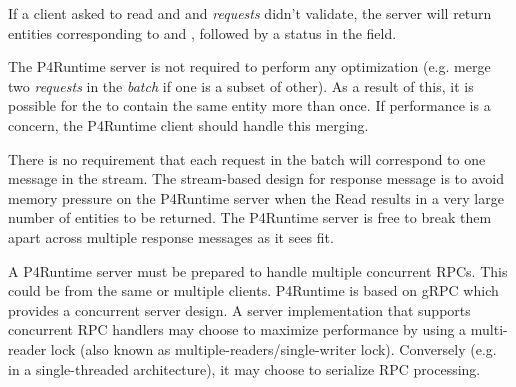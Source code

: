 \documentclass[11pt]{article}
\begin{document}
{%
\noindent{}If a client asked to read  and  and  \emph{requests} didn't
validate, the server will return entities corresponding to  and , followed
by a status  in the
 field.%

The P4Runtime server is not required to perform any optimization (e.g. merge two
\emph{requests} in the \emph{batch} if one is a subset of other). As a result of this, it
is possible for the  to contain the same entity more than once. If
performance is a concern, the P4Runtime client should handle this merging.%

There is no requirement that each request in the batch will correspond to one
 message in the stream. The stream-based design for response
message is to avoid memory pressure on the P4Runtime server when the Read
results in a very large number of entities to be returned. The P4Runtime server
is free to break them apart across multiple response messages as it sees fit.%

A P4Runtime server must be prepared to handle multiple concurrent  RPCs.
This could be from the same or multiple clients. P4Runtime is based on gRPC
which provides a concurrent server design. A server implementation that supports
concurrent RPC handlers may choose to maximize performance by using a
multi-reader lock (also known as multiple-readers/single-writer lock).
Conversely (e.g. in a single-threaded architecture), it may choose to serialize
 RPC processing.%

}
\end{document}
